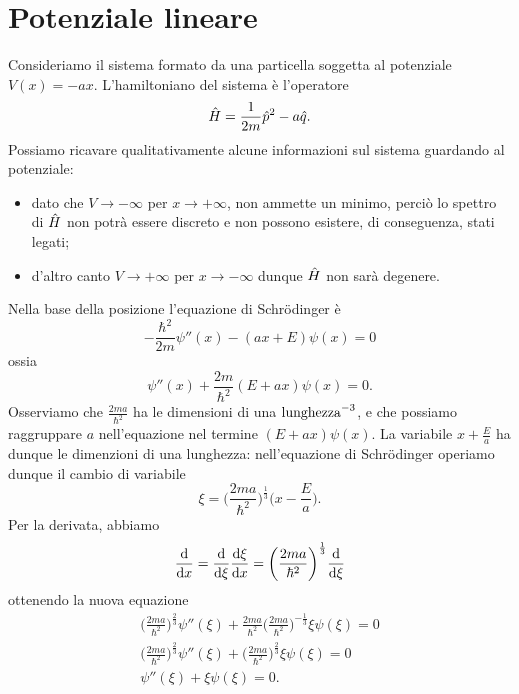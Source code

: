 \section{Potenziale lineare}
Consideriamo il sistema formato da una particella soggetta al potenziale $V(x)=-ax$.
L'hamiltoniano del sistema è l'operatore
\begin{equation}
	\hat{H}=\frac1{2m}\hat{p}^2-a\hat{q}.
	\label{eq:H-potenziale-lineare}
\end{equation}
Possiamo ricavare qualitativamente alcune informazioni sul sistema guardando al potenziale:
\begin{itemize}
	\item dato che $V\to-\infty$ per $x\to+\infty$, non ammette un minimo, perciò lo spettro di $\hat{H}$ non potrà essere discreto e non possono esistere, di conseguenza, stati legati;
	\item d'altro canto $V\to+\infty$ per $x\to-\infty$ dunque $\hat{H}$ non sarà degenere.
\end{itemize}
Nella base della posizione l'equazione di Schr\"odinger è
\begin{equation}
	-\frac{\hbar^2}{2m}\psi''(x)-(ax+E)\psi(x)=0
	\label{eq:schrodinger-posizione-potenziale-lineare}
\end{equation}
ossia
\begin{equation}
	\psi''(x)+\frac{2m}{\hbar^2}(E+ax)\psi(x)=0.
\end{equation}
Osserviamo che $\frac{2ma}{\hbar^2}$ ha le dimensioni di una $\textup{lunghezza}^{-3}$, e che possiamo raggruppare $a$ nell'equazione nel termine $(E+ax)\psi(x)$.
La variabile $x+\frac{E}{a}$ ha dunque le dimenzioni di una lunghezza: nell'equazione di Schr\"odinger operiamo dunque il cambio di variabile
\begin{equation}
	\xi=\bigg(\frac{2ma}{\hbar^2}\bigg)^{\frac13}\bigg(x-\frac{E}{a}\bigg).
\end{equation}
Per la derivata, abbiamo
\begin{equation}
	\frac{\textup{d} {}}{\textup{d} {x}}=\frac{\textup{d} {}}{\textup{d} {\xi}}\frac{\textup{d} {\xi}}{\textup{d} {x}}=\bigg(\frac{2ma}{\hbar^2}\bigg)^{\frac13}\frac{\textup{d} {}}{\textup{d} {\xi}}
\end{equation}
ottenendo la nuova equazione
\begin{equation}
	\begin{gathered}
		\bigg(\frac{2ma}{\hbar^2}\bigg)^{\frac23}\psi''(\xi)+\frac{2ma}{\hbar^2}\bigg(\frac{2ma}{\hbar^2}\bigg)^{-\frac13}\xi\psi(\xi)=0\\
		\bigg(\frac{2ma}{\hbar^2}\bigg)^{\frac23}\psi''(\xi)+\bigg(\frac{2ma}{\hbar^2}\bigg)^{\frac23}\xi\psi(\xi)=0\\
		\psi''(\xi)+\xi\psi(\xi)=0.
	\end{gathered}
	\label{eq:soluzione-potenziale-lineare}
\end{equation}
